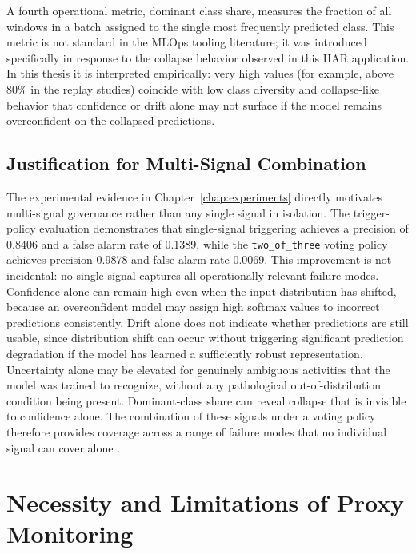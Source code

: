 A fourth operational metric, dominant class share, measures the fraction of all windows in a batch assigned to the single most frequently predicted class. This metric is not standard in the MLOps tooling literature; it was introduced specifically in response to the collapse behavior observed in this HAR application. In this thesis it is interpreted empirically: very high values (for example, above 80\% in the replay studies) coincide with low class diversity and collapse-like behavior that confidence or drift alone may not surface if the model remains overconfident on the collapsed predictions.

\subsection{Justification for Multi-Signal Combination}

The experimental evidence in Chapter~\ref{chap:experiments} directly motivates multi-signal governance rather than any single signal in isolation. The trigger-policy evaluation demonstrates that single-signal triggering achieves a precision of 0.8406 and a false alarm rate of 0.1389, while the \texttt{two\_of\_three} voting policy achieves precision 0.9878 and false alarm rate 0.0069. This improvement is not incidental: no single signal captures all operationally relevant failure modes. Confidence alone can remain high even when the input distribution has shifted, because an overconfident model may assign high softmax values to incorrect predictions consistently. Drift alone does not indicate whether predictions are still usable, since distribution shift can occur without triggering significant prediction degradation if the model has learned a sufficiently robust representation. Uncertainty alone may be elevated for genuinely ambiguous activities that the model was trained to recognize, without any pathological out-of-distribution condition being present. Dominant-class share can reveal collapse that is invisible to confidence alone. The combination of these signals under a voting policy therefore provides coverage across a range of failure modes that no individual signal can cover alone \cite{amershi2019mlops,hewage2022mlops}.

\section{Necessity and Limitations of Proxy Monitoring}
\label{sec:proxy_limits}

